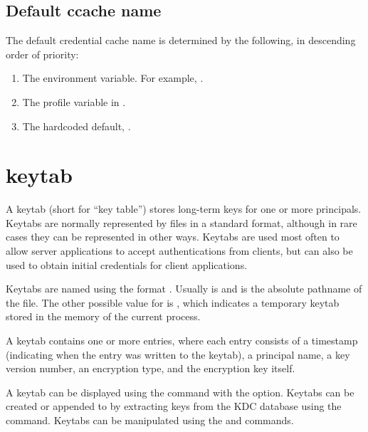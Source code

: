 \documentclass[letterpaper,10pt,english]{sphinxmanual}
\begin{document}
\section{Default ccache name}
\label{\detokenize{basic/ccache_def:default-ccache-name}}
The default credential cache name is determined by the following, in
descending order of priority:
\begin{enumerate}
\item {} 
The  environment variable.  For example,
.

\item {} 
The  profile variable in .

\item {} 
The hardcoded default, .

\end{enumerate}


\chapter{keytab}
\label{\detokenize{basic/keytab_def:keytab}}\label{\detokenize{basic/keytab_def::doc}}\label{\detokenize{basic/keytab_def:keytab-definition}}
A keytab (short for “key table”) stores long-term keys for one or more
principals.  Keytabs are normally represented by files in a standard
format, although in rare cases they can be represented in other ways.
Keytabs are used most often to allow server applications to accept
authentications from clients, but can also be used to obtain initial
credentials for client applications.

Keytabs are named using the format \sphinxcode{:}.  Usually
 is  and  is the absolute pathname of the file.
The other possible value for  is , which indicates a
temporary keytab stored in the memory of the current process.

A keytab contains one or more entries, where each entry consists of a
timestamp (indicating when the entry was written to the keytab), a
principal name, a key version number, an encryption type, and the
encryption key itself.

A keytab can be displayed using the  command with the
 option.  Keytabs can be created or appended to by extracting
keys from the KDC database using the  
command.  Keytabs can be manipulated using the  and
 commands.
\end{document}
